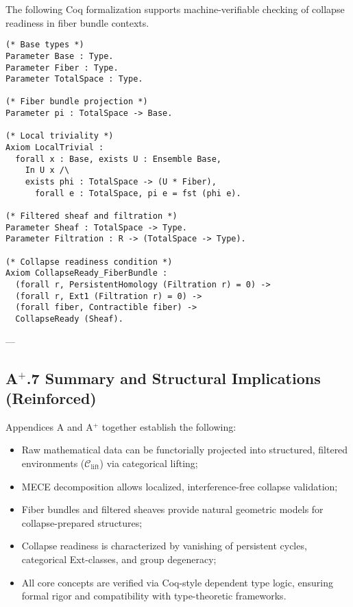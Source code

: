 \documentclass[11pt]{article}
\begin{document}
The following Coq formalization supports machine-verifiable checking of collapse readiness in fiber bundle contexts.

\begin{lstlisting}[language=Coq, caption=Collapse-Ready Filtered Sheaf over Fiber Bundle]
(* Base types *)
Parameter Base : Type.
Parameter Fiber : Type.
Parameter TotalSpace : Type.

(* Fiber bundle projection *)
Parameter pi : TotalSpace -> Base.

(* Local triviality *)
Axiom LocalTrivial :
  forall x : Base, exists U : Ensemble Base,
    In U x /\
    exists phi : TotalSpace -> (U * Fiber),
      forall e : TotalSpace, pi e = fst (phi e).

(* Filtered sheaf and filtration *)
Parameter Sheaf : TotalSpace -> Type.
Parameter Filtration : R -> (TotalSpace -> Type).

(* Collapse readiness condition *)
Axiom CollapseReady_FiberBundle :
  (forall r, PersistentHomology (Filtration r) = 0) ->
  (forall r, Ext1 (Filtration r) = 0) ->
  (forall fiber, Contractible fiber) ->
  CollapseReady (Sheaf).
\end{lstlisting}

---

\subsection*{A$^{+}$.7 Summary and Structural Implications (Reinforced)}

Appendices A and A$^+$ together establish the following:

\begin{itemize}
    \item Raw mathematical data can be functorially projected into structured, filtered environments (\( \mathcal{C}_{\mathrm{lift}} \)) via categorical lifting;
    \item MECE decomposition allows localized, interference-free collapse validation;
    \item Fiber bundles and filtered sheaves provide natural geometric models for collapse-prepared structures;
    \item Collapse readiness is characterized by vanishing of persistent cycles, categorical Ext-classes, and group degeneracy;
    \item All core concepts are verified via Coq-style dependent type logic, ensuring formal rigor and compatibility with type-theoretic frameworks.
\end{itemize}
\end{document}
